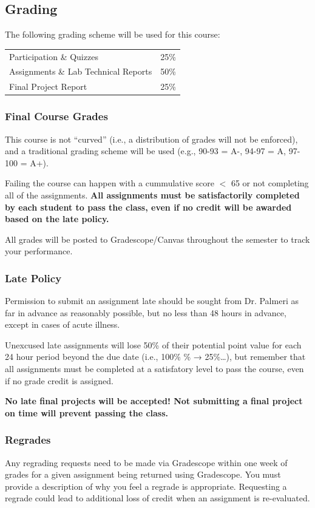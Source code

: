 \documentclass[10pt]{report}
\begin{document}
\subsection*{Grading} 
The following grading scheme will be used for this course:

\begin{center}
\begin{tabular}{ll}
Participation \& Quizzes             & 25\% \\
Assignments \& Lab Technical Reports & 50\% \\
Final Project Report                 & 25\% \\
\end{tabular}
\end{center}

\subsubsection*{Final Course Grades}
This course is not ``curved'' (i.e., a distribution of grades will not be
enforced), and a traditional grading scheme will be used (e.g., 90-93 = A-,
94-97 = A, 97-100 = A+).

Failing the course can happen with a cummulative score $<$ 65 or not completing
all of the assignments.  \textbf{All assignments must be satisfactorily
completed by each student to pass the class, even if no credit will be awarded
based on the late policy.}

All grades will be posted to Gradescope/Canvas throughout the semester to
track your performance.


\subsubsection*{Late Policy}
Permission to submit an assignment late should be sought from Dr. Palmeri as far
in advance as reasonably possible, but no less than 48 hours in advance, except
in cases of acute illness.

Unexcused late assignments will lose 50\% of their potential point value for
each 24 hour period beyond the due date (i.e., 100\% \% →
25\%\ldots), but remember that all assignments must be completed at a
satisfatory level to pass the course, even if no grade credit is assigned.

\textbf{No late final projects will be accepted!  Not submitting a final project
on time will prevent passing the class.}

\subsubsection*{Regrades}
Any regrading requests need to be made via Gradescope within one week of grades
for a given assignment being returned using Gradescope. You must provide a
description of why you feel a regrade is appropriate. Requesting a regrade could
lead to additional loss of credit when an assignment is re-evaluated.
\end{document}
